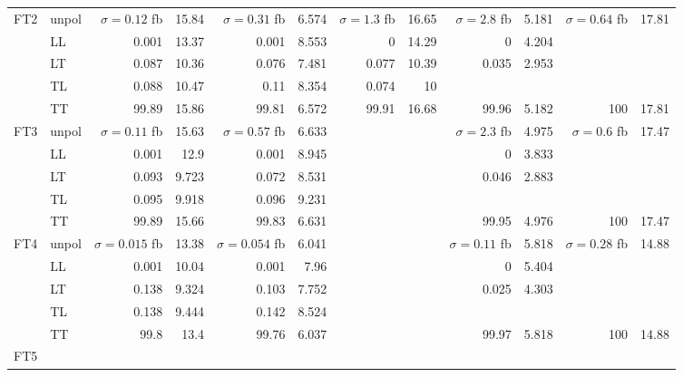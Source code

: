 \begin{table}[h]
{\begin{tabular}{llrrrrrrrrrr}
\midrule
\multirow{5}{*}{FT2}
 & unpol & $\sigma = \num{0.12}$ fb & \num{15.84} & $\sigma = \num{0.31}$ fb & \num{6.574} & $\sigma = \num{1.3}$ fb & \num{16.65} & $\sigma = \num{2.8}$ fb & \num{5.181} & $\sigma = \num{0.64}$ fb & \num{17.81} \\
 & LL & \num{0.001} & \num{13.37} & \num{0.001} & \num{8.553} & \num{0} & \num{14.29} & \num{0} & \num{4.204} &  &  \\
 & LT & \num{0.087} & \num{10.36} & \num{0.076} & \num{7.481} & \num{0.077} & \num{10.39} & \num{0.035} & \num{2.953} &  &  \\
 & TL & \num{0.088} & \num{10.47} & \num{0.11} & \num{8.354} & \num{0.074} & \num{10} &  &  &  &  \\
 & TT & \num{99.89} & \num{15.86} & \num{99.81} & \num{6.572} & \num{99.91} & \num{16.68} & \num{99.96} & \num{5.182} & \num{100} & \num{17.81} \\
\midrule
\multirow{5}{*}{FT3}
 & unpol & $\sigma = \num{0.11}$ fb & \num{15.63} & $\sigma = \num{0.57}$ fb & \num{6.633} &  &  & $\sigma = \num{2.3}$ fb & \num{4.975} & $\sigma = \num{0.6}$ fb & \num{17.47} \\
 & LL & \num{0.001} & \num{12.9} & \num{0.001} & \num{8.945} &  &  & \num{0} & \num{3.833} &  &  \\
 & LT & \num{0.093} & \num{9.723} & \num{0.072} & \num{8.531} &  &  & \num{0.046} & \num{2.883} &  &  \\
 & TL & \num{0.095} & \num{9.918} & \num{0.096} & \num{9.231} &  &  &  &  &  &  \\
 & TT & \num{99.89} & \num{15.66} & \num{99.83} & \num{6.631} &  &  & \num{99.95} & \num{4.976} & \num{100} & \num{17.47} \\
\midrule
\multirow{5}{*}{FT4}
 & unpol & $\sigma = \num{0.015}$ fb & \num{13.38} & $\sigma = \num{0.054}$ fb & \num{6.041} &  &  & $\sigma = \num{0.11}$ fb & \num{5.818} & $\sigma = \num{0.28}$ fb & \num{14.88} \\
 & LL & \num{0.001} & \num{10.04} & \num{0.001} & \num{7.96} &  &  & \num{0} & \num{5.404} &  &  \\
 & LT & \num{0.138} & \num{9.324} & \num{0.103} & \num{7.752} &  &  & \num{0.025} & \num{4.303} &  &  \\
 & TL & \num{0.138} & \num{9.444} & \num{0.142} & \num{8.524} &  &  &  &  &  &  \\
 & TT & \num{99.8} & \num{13.4} & \num{99.76} & \num{6.037} &  &  & \num{99.97} & \num{5.818} & \num{100} & \num{14.88} \\
\midrule
\multirow{5}{*}{FT5}

\end{tabular}}
\end{table}
